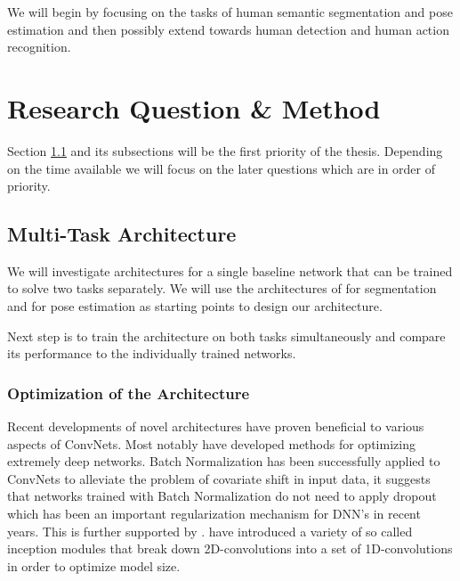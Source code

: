 \documentclass[a4paper,10pt]{article}
\begin{document}
We will begin by focusing on the tasks of human semantic segmentation and pose estimation and then possibly extend towards human detection and human action recognition.






\section{Research Question \& Method}

Section \ref{sec:arc:multi} and its subsections will be the first priority of the thesis.  Depending on the time available we will focus on the later questions which are in order of priority.


\subsection{Multi-Task Architecture}
\label{sec:arc:multi}
We will investigate architectures for a single baseline network that can be trained to solve two tasks separately.  We will use the architectures of \cite{Long2014,Noh2015} for segmentation and \cite{Tompson2015,Wei2016} for pose estimation as starting points to design our architecture.

Next step is to train the architecture on both tasks simultaneously and compare its performance to the individually trained networks.

\subsubsection{Optimization of the Architecture}
\label{sec:arc:optimization}
Recent developments of novel architectures have proven beneficial to various aspects of ConvNets.  Most notably \cite{He2015,Srivastava2015} have developed methods for optimizing extremely deep networks.  Batch Normalization \cite{Ioffe2015} has been successfully applied to ConvNets to alleviate the problem of covariate shift in input data, it suggests that networks trained with Batch Normalization do not need to apply dropout \cite{Srivastava2014} which has been an important regularization mechanism for DNN's in recent years.  This is further supported by \cite{He2015}.  \cite{Szegedy2014,Szegedy2015} have introduced a variety of so called inception modules that break down 2D-convolutions into a set of 1D-convolutions in order to optimize model size.
\end{document}
